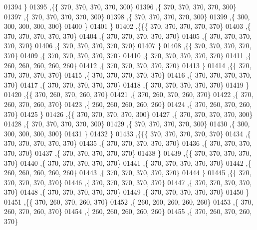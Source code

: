 \begin{DoxyCode}
01394    \}
01395   ,\{\{   370,   370,   370,   370,   300\}
01396    ,\{   370,   370,   370,   370,   300\}
01397    ,\{   370,   370,   370,   370,   300\}
01398    ,\{   370,   370,   370,   370,   300\}
01399    ,\{   300,   300,   300,   300,   300\}
01400    \}
01401   \}
01402  ,\{\{\{   370,   370,   370,   370,   370\}
01403    ,\{   370,   370,   370,   370,   370\}
01404    ,\{   370,   370,   370,   370,   370\}
01405    ,\{   370,   370,   370,   370,   370\}
01406    ,\{   370,   370,   370,   370,   370\}
01407    \}
01408   ,\{\{   370,   370,   370,   370,   370\}
01409    ,\{   370,   370,   370,   370,   370\}
01410    ,\{   370,   370,   370,   370,   370\}
01411    ,\{   260,   260,   260,   260,   260\}
01412    ,\{   370,   370,   370,   370,   370\}
01413    \}
01414   ,\{\{   370,   370,   370,   370,   370\}
01415    ,\{   370,   370,   370,   370,   370\}
01416    ,\{   370,   370,   370,   370,   370\}
01417    ,\{   370,   370,   370,   370,   370\}
01418    ,\{   370,   370,   370,   370,   370\}
01419    \}
01420   ,\{\{   370,   260,   370,   260,   370\}
01421    ,\{   370,   260,   370,   260,   370\}
01422    ,\{   370,   260,   370,   260,   370\}
01423    ,\{   260,   260,   260,   260,   260\}
01424    ,\{   370,   260,   370,   260,   370\}
01425    \}
01426   ,\{\{   370,   370,   370,   370,   300\}
01427    ,\{   370,   370,   370,   370,   300\}
01428    ,\{   370,   370,   370,   370,   300\}
01429    ,\{   370,   370,   370,   370,   300\}
01430    ,\{   300,   300,   300,   300,   300\}
01431    \}
01432   \}
01433  ,\{\{\{   370,   370,   370,   370,   370\}
01434    ,\{   370,   370,   370,   370,   370\}
01435    ,\{   370,   370,   370,   370,   370\}
01436    ,\{   370,   370,   370,   370,   370\}
01437    ,\{   370,   370,   370,   370,   370\}
01438    \}
01439   ,\{\{   370,   370,   370,   370,   370\}
01440    ,\{   370,   370,   370,   370,   370\}
01441    ,\{   370,   370,   370,   370,   370\}
01442    ,\{   260,   260,   260,   260,   260\}
01443    ,\{   370,   370,   370,   370,   370\}
01444    \}
01445   ,\{\{   370,   370,   370,   370,   370\}
01446    ,\{   370,   370,   370,   370,   370\}
01447    ,\{   370,   370,   370,   370,   370\}
01448    ,\{   370,   370,   370,   370,   370\}
01449    ,\{   370,   370,   370,   370,   370\}
01450    \}
01451   ,\{\{   370,   260,   370,   260,   370\}
01452    ,\{   260,   260,   260,   260,   260\}
01453    ,\{   370,   260,   370,   260,   370\}
01454    ,\{   260,   260,   260,   260,   260\}
01455    ,\{   370,   260,   370,   260,   370\}

\end{DoxyCode}
